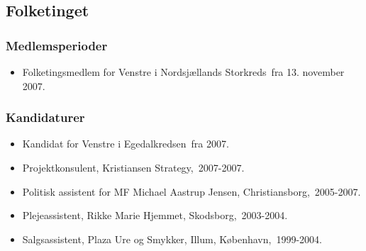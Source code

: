 \documentclass[11pt, a4paper]{awesome-cv}
\begin{document}
\begin{cvletter}
\subsection*{Folketinget}
\subsubsection*{Medlemsperioder}
\begin{itemize}
\item Folketingsmedlem for Venstre i Nordsjællands Storkreds fra 13. november 2007.
\end{itemize}
\subsubsection*{Kandidaturer}
\begin{itemize}
\item Kandidat for Venstre i Egedalkredsen fra 2007.
\end{itemize}
\begin{itemize}
\item Projektkonsulent, Kristiansen Strategy, 2007-2007.
\item Politisk assistent for MF Michael Aastrup Jensen, Christiansborg, 2005-2007.
\item Plejeassistent, Rikke Marie Hjemmet, Skodsborg, 2003-2004.
\item Salgsassistent, Plaza Ure og Smykker, Illum, København, 1999-2004.
\end{itemize}
\end{cvletter}
\end{document}
